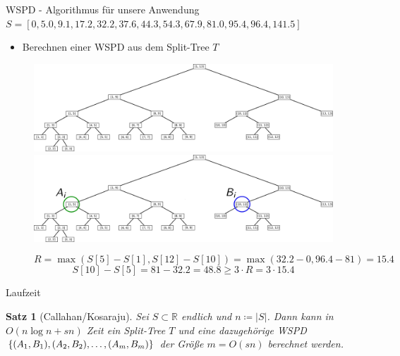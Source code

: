 \documentclass{beamer}
\newtheorem{thm}{Satz}
\begin{document}
	\begin{frame}[t]{WSPD - Algorithmus für unsere Anwendung}
		$S = [0, 5.0, 9.1, 17.2, 32.2, 37.6, 44.3, 54.3, 67.9, 81.0, 95.4, 96.4, 141.5]$
		\begin{itemize}
			\item Berechnen einer WSPD aus dem Split-Tree $T$
		\end{itemize}
		\begin{figure}
			\centering
			\def \svgwidth{\textwidth}
			\begin{overprint}
				\includegraphics[width=\textwidth]{split_tree.png}
				\onslide<2->\includegraphics[width=\textwidth]{split_tree_2_wspd.png}
			\end{overprint}
			\[
			R = \max(S[5]-S[1], S[12]-S[10]) = \max(32.2 - 0, 96.4 - 81) = 15.4
			\]
			\[
			S[10]- S[5] = 81 - 32.2 = 48.8 \geq 3 \cdot R = 3 \cdot 15.4
			\]
		\end{figure}

	\end{frame}

	\begin{frame}{Laufzeit}
		\begin{thm}[Callahan/Kosaraju]
			Sei $S \subset \mathbb{R}$ endlich und $n \coloneqq |S|$. Dann kann in $O(n \log n + sn)$ Zeit ein Split-Tree $T$ und eine dazugehörige WSPD $\{(A_1, B_1), (A_2, B_2), \mathellipsis, (A_m, B_m)\}$ der Größe $m = O(sn)$ berechnet werden.
		\end{thm}
	\end{frame}
	
\end{document}
